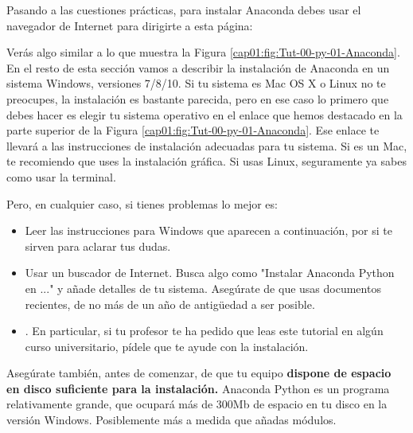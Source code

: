 \documentclass[10pt,a4paper]{article}\usepackage[]{graphicx}\usepackage[]{color}
\newcounter {cont01}
\begin{document}
Pasando a las cuestiones prácticas, para instalar Anaconda debes usar el  navegador de Internet para dirigirte a esta página:
\begin{center}
\end{center}
Verás algo similar a lo que muestra la Figura \ref{cap01:fig:Tut-00-py-01-Anaconda}. En el resto de esta sección vamos a describir la instalación de Anaconda en un sistema Windows, versiones 7/8/10. Si tu sistema es Mac OS X o Linux no te preocupes, la instalación es bastante parecida, pero en ese caso lo primero que debes hacer es elegir tu sistema operativo en el enlace que hemos destacado en la parte superior de la Figura \ref{cap01:fig:Tut-00-py-01-Anaconda}. Ese enlace te llevará a las instrucciones de instalación adecuadas para tu sistema. Si es un Mac, te recomiendo que uses la instalación gráfica. Si usas Linux,  seguramente ya sabes como usar la terminal. 

Pero, en cualquier caso, si tienes problemas lo mejor es: 
\begin{itemize}
  \item Leer las instrucciones para Windows que aparecen a continuación, por si te sirven para aclarar tus dudas.
  \item Usar un buscador de Internet. Busca algo como "Instalar Anaconda Python en ..." y añade detalles de tu sistema. Asegúrate de que usas documentos recientes, de no más de un año de antigüedad a ser posible. 
  \item {}. En particular, si tu profesor te ha pedido que leas este tutorial en algún curso universitario, pídele que te ayude con la instalación.  
\end{itemize}

Asegúrate también, antes de comenzar, de que tu equipo {\bf dispone de espacio en disco suficiente para la instalación.} Anaconda Python es un programa relativamente grande, que ocupará más de 300Mb de espacio en tu disco en la versión Windows. Posiblemente más a medida que añadas módulos.
\end{document}
